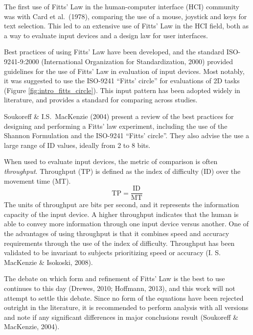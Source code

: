 The first use of Fitts' Law in the human-computer interface (HCI) community was with Card et al.\ (1978), comparing the use of a mouse, joystick and keys for text selection.
This led to an extensive use of Fitts' Law in the HCI field, both as a way to evaluate input devices and a design law for user interfaces.

Best practices of using Fitts' Law have been developed, and the standard ISO-9241-9:2000 (International Organization for Standardization, 2000) provided guidelines for the use of Fitts' Law in evaluation of input devices.
Most notably, it was suggested to use the ISO-9241 ``Fitts' circle'' for evaluations of 2D tasks (Figure \ref{fig:intro_fitts_circle}).
This input pattern has been adopted widely in literature, and provides a standard for comparing across studies.

Soukoreff \& I.S.\ MacKenzie (2004) present a review of the best practices for designing and performing a Fitts' law experiment, including the use of the Shannon Formulation and the ISO-9241 ``Fitts' circle''.
They also advise the use a large range of ID values, ideally from 2 to 8 bits.


When used to evaluate input devices, the metric of comparison is often \emph{throughput}.
Throughput (TP) is defined as the index of difficulty (ID) over the movement time (MT).
\begin{equation}
    \mathrm{TP} = \frac{\text{ID}}{\text{MT}}
\end{equation}
The units of throughput are bits per second, and it represents the information capacity of the input device.
A higher throughput indicates that the human is able to convey more information through one input device versus another.
One of the advantages of using throughput is that it combines speed and accuracy requirements through the use of the index of difficulty.
Throughput has been validated to be invariant to subjects prioritizing speed or accuracy (I.  S.  MacKenzie \& Isokoski, 2008).

The debate on which form and refinement of Fitts' Law is the best to use continues to this day (Drewes, 2010; Hoffmann, 2013), and this work will not attempt to settle this debate.
Since no form of the equations have been rejected outright in the literature, it is recommended to perform analysis with all versions and note if any significant differences in major conclusions result (Soukoreff \& MacKenzie, 2004).

